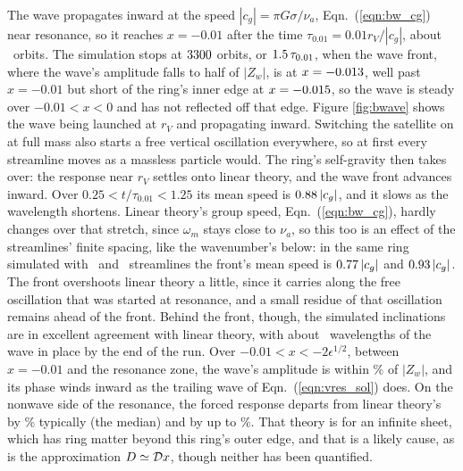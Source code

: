 \documentclass[twocolumn]{aastex702}
\begin{document}
The wave propagates inward at the speed $|c_g| = \pi G\sigma/\nu_a$, Eqn.\ (\ref{eqn:bw_cg}) near resonance,
so it reaches $x = -0.01$ after the time $\tau_{0.01} = 0.01r_V/|c_g|$, about \bwTauOrbits\ orbits. The
simulation stops at $3300$ orbits, or $1.5\,\tau_{0.01}$, when the wave front, where the
wave's amplitude falls to half of $|Z_w|$, is at $x = -0.013$, well past $x = -0.01$ but short of the ring's inner edge at $x = -0.015$, so the wave
is steady over $-0.01 < x < 0$ and has not reflected off that edge.
Figure \ref{fig:bwave} shows the wave being launched at $r_V$ and propagating inward.
Switching the
satellite on at full mass also starts a free vertical oscillation everywhere, so at first every streamline
moves as a massless particle would. The ring's self-gravity then takes over: the response near $r_V$
settles onto linear theory, and the wave front advances inward. Over $0.25 < t/\tau_{0.01} < 1.25$ its
mean speed is $0.88\,|c_g|$, and it slows as the wavelength shortens. Linear theory's group speed,
Eqn.\ (\ref{eqn:bw_cg}), hardly changes over that stretch, since $\omega_m$ stays close to $\nu_a$, so this too is an
effect of the streamlines' finite spacing, like the wavenumber's below: in the same ring simulated with
\bwNstreamlinesCoarse\ and \bwNstreamlinesFine\ streamlines the front's mean speed is
$0.77\,|c_g|$ and $0.93\,|c_g|$. The front overshoots linear
theory a little, since it carries along the free oscillation that was started at resonance, and a small
residue of that oscillation remains ahead of the front. Behind the front, though, the simulated
inclinations are in excellent agreement with linear theory, with about \bwCrests\ wavelengths of the wave
in place by the end of the run. Over $-0.01 < x < -2\epsilon^{1/2}$, between $x = -0.01$ and the resonance zone,
the wave's amplitude is within \bwAmpPercent\% of $|Z_w|$, and its
phase winds inward as the trailing wave of Eqn.\ (\ref{eqn:vres_sol}) does. On the nonwave side of the
resonance, the forced response departs from linear theory's by \bwForcedMedianPercent\% typically (the median)
and by up to \bwForcedPercent\%. That theory is for an infinite sheet, which has ring matter beyond this
ring's outer edge, and that is a likely cause, as is the approximation $D \simeq {\cal D}x$, though neither has been
quantified.
\end{document}
